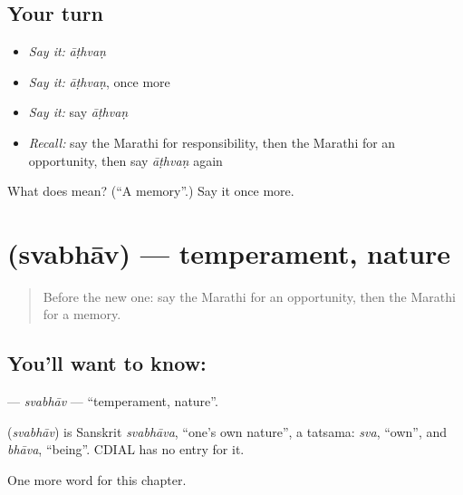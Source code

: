 \subsection*{Your turn}
\begin{itemize}
\raggedright
  \item \emph{Say it:} \emph{āṭhvaṇ}
  \item \emph{Say it:} \emph{āṭhvaṇ}, once more
  \item \emph{Say it:} say \emph{āṭhvaṇ}
  \item \emph{Recall:} say the Marathi for responsibility, then the Marathi for an opportunity, then say \emph{āṭhvaṇ} again
\end{itemize}

\begin{tcolorbox}[breakable,colback=teal!4,colframe=teal!35!black,title={Before you move on}]
What does  mean? (\textquotedblleft{}A memory\textquotedblright{}.) Say it once more.
\end{tcolorbox}
\section[\texorpdfstring{\mr{स्वभाव} (svabhāv)}{स्वभाव (svabhāv)}]{ (svabhāv) — temperament, nature}

\label{lesson:MR-C273-svabhav}



\begin{quote}
Before the new one: say the Marathi for an opportunity, then the Marathi for a memory.
\end{quote}

\subsection*{You'll want to know: }
\textbf{} — \emph{svabhāv} — \textquotedblleft{}temperament, nature\textquotedblright{}.

\begin{cousinweb}
\textbf{} (\emph{svabhāv}) is Sanskrit \emph{svabhāva}, \textquotedblleft{}one's own nature\textquotedblright{}, a tatsama: \emph{sva}, \textquotedblleft{}own\textquotedblright{}, and \emph{bhāva}, \textquotedblleft{}being\textquotedblright{}. CDIAL has no entry for it.
\end{cousinweb}

\begin{grammarlens}[title={What you've built}]
One more word for this chapter.
\end{grammarlens}

